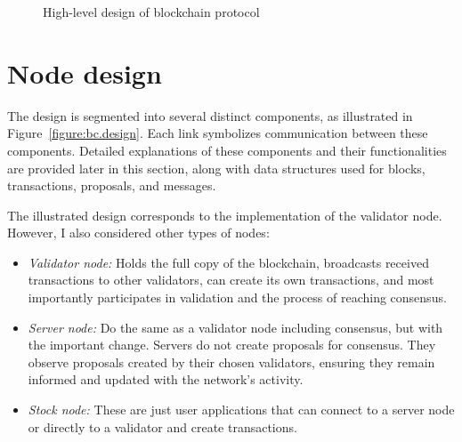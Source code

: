 \begin{figure}[h]
    \begin{center}
    \end{center}
    \caption{High-level design of blockchain protocol}
    \label{figure:bc.high-level}
\end{figure}


\section{Node design}
\label{sec:node.BC}

The design is segmented into several distinct components, as illustrated in Figure~\ref{figure:bc.design}. Each link symbolizes communication between these components. Detailed explanations of these components and their functionalities are provided later in this section, along with data structures used for blocks, transactions, proposals, and messages. 

The illustrated design corresponds to the implementation of the validator node. However, I also considered other types of nodes:

\begin{itemize}
    \item \emph{Validator node:} Holds the full copy of the blockchain, broadcasts received transactions to other validators, can create its own transactions, and most importantly participates in validation and the process of reaching consensus.
    \item \emph{Server node:} Do the same as a validator node including consensus, but with the important change. Servers do not create proposals for consensus. They observe proposals created by their chosen validators, ensuring they remain informed and updated with the network's activity.
    \item \emph{Stock node:} These are just user applications that can connect to a server node or directly to a validator and create transactions.
\end{itemize}

